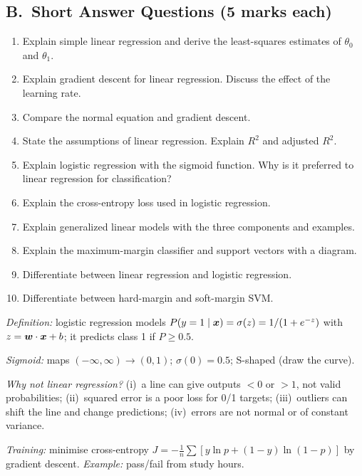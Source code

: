 \subsection*{B.\ Short Answer Questions (5 marks each)}
\begin{enumerate}
  \item Explain simple linear regression and derive the least-squares estimates of $\theta_0$ and $\theta_1$. 
  \item Explain gradient descent for linear regression. Discuss the effect of the learning rate. 
  \item Compare the normal equation and gradient descent. 
  \item State the assumptions of linear regression. Explain $R^2$ and adjusted $R^2$. 
  \item Explain logistic regression with the sigmoid function. Why is it preferred to linear regression for classification? 
  \item Explain the cross-entropy loss used in logistic regression. 
  \item Explain generalized linear models with the three components and examples. 
  \item Explain the maximum-margin classifier and support vectors with a diagram. 
  \item Differentiate between linear regression and logistic regression. 
  \item Differentiate between hard-margin and soft-margin SVM. 
\end{enumerate}

\begin{modelans}
\emph{Definition:} logistic regression models $P(y=1\mid\boldsymbol{x})=\sigma(z)=1/(1+e^{-z})$ with $z=\boldsymbol{w}\cdot\boldsymbol{x}+b$; it predicts class 1 if $P\ge0.5$.\par
\emph{Sigmoid:} maps $(-\infty,\infty)\to(0,1)$; $\sigma(0)=0.5$; S-shaped (draw the curve).\par
\emph{Why not linear regression?} (i)~a line can give outputs $<0$ or $>1$, not valid probabilities; (ii)~squared error is a poor loss for 0/1 targets; (iii)~outliers can shift the line and change predictions; (iv)~errors are not normal or of constant variance.\par
\emph{Training:} minimise cross-entropy $J=-\frac1n\sum[y\ln p+(1-y)\ln(1-p)]$ by gradient descent. \emph{Example:} pass/fail from study hours.
\end{modelans}

